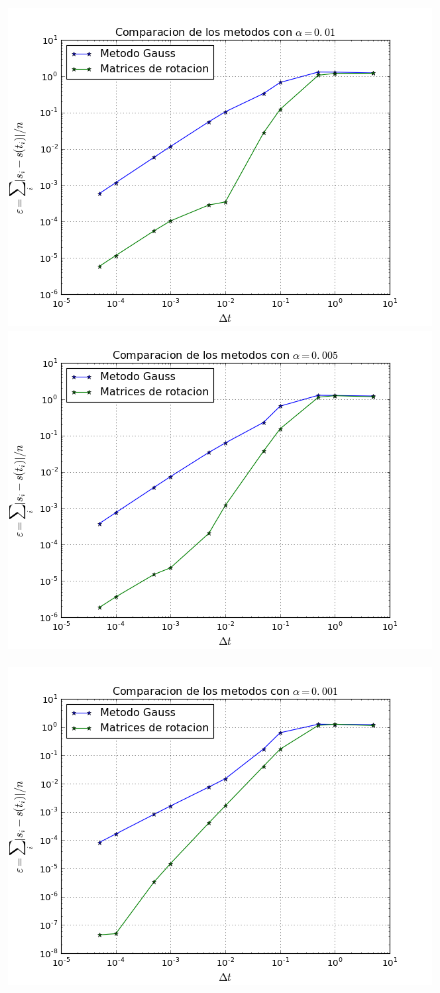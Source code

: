 \documentclass[a4paper, 11pt, spanish]{article}
\begin{document}
\begin{figure}[!ht]
\includegraphics[scale=0.4]{img/comparacion_metodos_1e-2.png}
\includegraphics[scale=0.4]{img/comparacion_metodos_5e-3.png}
\end{figure}
\begin{figure}[!ht]
\centering
\includegraphics[scale=0.4]{img/comparacion_metodos_1e-3.png}
\end{figure}
\\
\vspace*{15cm}
\end{document}
